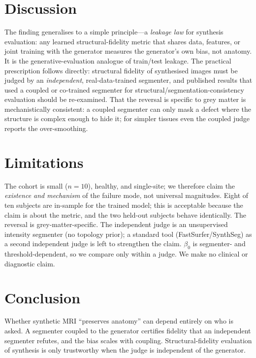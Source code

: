 \documentclass[11pt,a4paper]{article}
\begin{document}
\section{Discussion}
The finding generalises to a simple principle---a \emph{leakage law} for synthesis evaluation:
any learned structural-fidelity metric that shares data, features, or joint training with the
generator measures the generator's own bias, not anatomy. It is the generative-evaluation analogue
of train/test leakage. The practical prescription follows directly: structural fidelity of
synthesised images must be judged by an \emph{independent}, real-data-trained segmenter, and
published results that used a coupled or co-trained segmenter for structural/segmentation-consistency
evaluation should be re-examined. That the reversal is specific to grey matter is mechanistically
consistent: a coupled segmenter can only mask a defect where the structure is complex enough to
hide it; for simpler tissues even the coupled judge reports the over-smoothing.

\section{Limitations}
The cohort is small ($n=10$), healthy, and single-site; we therefore claim the \emph{existence and
mechanism} of the failure mode, not universal magnitudes. Eight of ten subjects are in-sample for
the trained model; this is acceptable because the claim is about the metric, and the two held-out
subjects behave identically. The reversal is grey-matter-specific. The independent judge is an
unsupervised intensity segmenter (no topology prior); a standard tool (FastSurfer/SynthSeg) as a
second independent judge is left to strengthen the claim. $\beta_0$ is segmenter- and
threshold-dependent, so we compare only within a judge. We make no clinical or diagnostic claim.

\section{Conclusion}
Whether synthetic MRI ``preserves anatomy'' can depend entirely on who is asked. A segmenter
coupled to the generator certifies fidelity that an independent segmenter refutes, and the bias
scales with coupling. Structural-fidelity evaluation of synthesis is only trustworthy when the
judge is independent of the generator.


\end{document}

